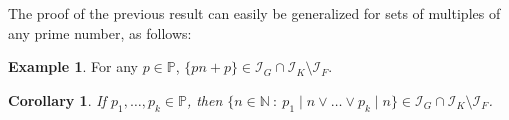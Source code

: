 \documentclass{amsart}
\newtheorem{cor}{Corollary}
\theoremstyle{definition}
\newtheorem{problem}{Problem}
\theoremstyle{definition}
\newtheorem{ex}{Example}
\newcommand{\N}{{\mathbb N}}
\newcommand{\I}{\mathcal I}
\begin{document}
The proof of the previous result can easily be generalized for sets of multiples of any prime number, as follows:

\begin{ex} 
For any $p\in\mathbb{P}$, $\{pn+p\}\in \I_G \cap \I_K \setminus \I_F$.
\end{ex}


\begin{cor}
If $p_1, \ldots, p_k \in \mathbb{P}$, then $\{n\in\N\ :\ p_1\mid n \vee \ldots \vee p_k\mid n\}\in \I_G \cap \I_K \setminus \I_F$.
\end{cor}

\end{document}
